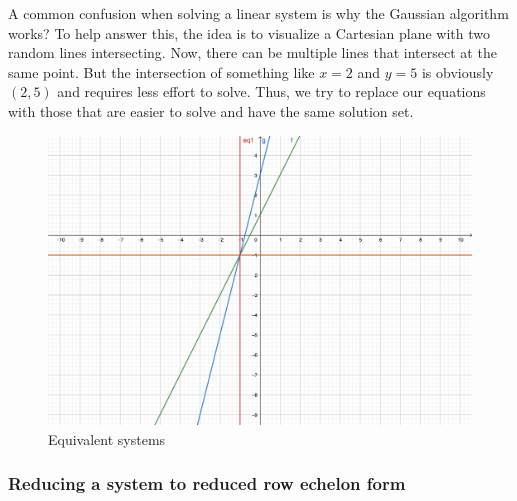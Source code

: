 \documentclass{article}
\begin{document}
A common confusion when solving a linear system is why the Gaussian algorithm works? To help answer this, the idea is to visualize a Cartesian plane with two random lines intersecting. Now, there can be multiple lines that intersect at the same point. But the intersection of something like $x=2$ and $y=5$ is obviously $(2,5)$ and requires less effort to solve. Thus, we try to replace our equations with those that are easier to solve and have the same solution set. 

\begin{figure}[h]
    \centering
    \includegraphics[scale=0.5]{epflSemesterOne/linearAlgebra/figures/linearGauss.png}
    \caption{Equivalent systems}
    \label{fig1}
\end{figure}

\subsubsection{Reducing a system to reduced row echelon form}
\end{document}
